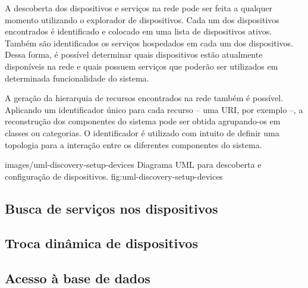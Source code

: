 A descoberta dos dispositivos e serviços  na rede pode ser
feita a qualquer momento utilizando o explorador de dispositivos. Cada um dos dispositivos
encontrados é identificado e colocado em uma lista de dispositivos ativos. Também são identificados
os serviços hospedados em cada um dos dispositivos. Dessa forma, é possível determinar quais
dispositivos estão atualmente disponíveis na rede e quais possuem serviços que poderão ser
utilizados em determinada funcionalidade do sistema.

A geração da hierarquia de recursos encontrados na rede também é possível. Aplicando um
identificador único para cada recurso -- uma \gls{URI}, por exemplo --, a reconstrução dos
componentes do sistema pode ser obtida agrupando-os em classes ou categorias. O identificador é
utilizado com intuito de definir uma topologia para a interação entre os diferentes componentes do
sistema.

    {images/uml-discovery-setup-devices}
    {Diagrama UML para descoberta e configuração de dispositivos.}
    {fig:uml-discovery-setup-devices}



\subsection{Busca de serviços nos dispositivos}



\subsection{Troca dinâmica de dispositivos}


\subsection{Acesso à base de dados}


